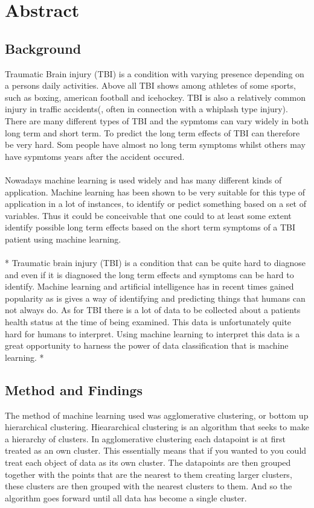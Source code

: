 \documentclass[11pt]{article}
\begin{document}
\section*{Abstract}

\subsection*{Background}

Traumatic Brain injury (TBI) is a condition with varying presence depending on a persons daily activities. Above all TBI shows among athletes of some sports, such as boxing, american football and icehockey. TBI is also a relatively common injury in traffic accidents(, often in connection with a whiplash type injury). There are many different types of TBI and the sypmtoms can vary widely in both long term and short term. To predict the long term effects of TBI can therefore be very hard. Som people have almost no long term symptoms whilst others may have sypmtoms years after the accident occured.\\
\\
Nowadays machine learning is used widely and has many different kinds of application. Machine learning has been shown to be very suitable for this type of application in a lot of instances, to identify or pedict something based on a set of variables. Thus it could be conceivable that one could to at least some extent identify possible long term effects based on the short term symptoms of a TBI patient using machine learning.\\
\\
*
Traumatic brain injury (TBI) is a condition that can be quite hard to diagnose and even if it is diagnosed the long term effects and symptoms can be hard to identify. Machine learning and artificial intelligence has in recent times gained popularity as is gives a way of identifying and predicting things that humans can not always do. As for TBI there is a lot of data to be collected about a patients health status at the time of being examined. This data is unfortunately quite hard for humans to interpret. Using machine learning to interpret this data is a great opportunity to harness the power of data classification that is machine learning.
*

\subsection*{Method and Findings}
The method of machine learning used was agglomerative clustering, or bottom up hierarchical clustering. Hieararchical clustering is an algorithm that seeks to make a hierarchy of clusters.
In agglomerative clustering each datapoint is at first treated as an own cluster. This essentially means that if you wanted to you could treat each object of data as its own cluster. The datapoints are then grouped together with the points that are the nearest to them creating larger clusters, these clusters are then grouped with the nearest clusters to them. And so the algorithm goes forward until all data has become a single cluster.\cite{HierarchicalClustering2020a}
\end{document}
